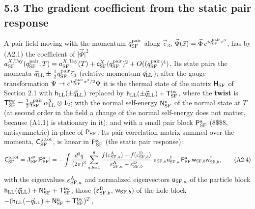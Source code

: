 \documentclass[
  10pt,
]{article}
\begin{document}
\hypertarget{the-gradient-coefficient-from-the-static-pair-response}{%
\subsection{5.3 The gradient coefficient from the static pair
response}\label{the-gradient-coefficient-from-the-static-pair-response}}

A pair field moving with the momentum \(q^{\rm pair}_{\rm SF}\) along
\(\vec e_3\),
\(\vec\Phi(\vec x)=\vec\Phi\,e^{iq^{\rm pair}_{\rm SF}x^3}\), has by
(A2.1) the coefficient of \(\lvert\vec\Phi\rvert^2\)
\(a^{X,{\rm Tay}}_{\rm SF}(q^{\rm pair}_{\rm SF};T)=a^{X,{\rm Tay}}_{\rm SF}(T)+\mathsf c^X_{\rm SF}(q^{\rm pair}_{\rm SF})^2+O((q^{\rm pair}_{\rm SF})^4)\).
Its state pairs the momenta
\(\vec q_{\rm LL}\pm\tfrac12q^{\rm pair}_{\rm SF}\vec e_3\) (relative
momentum \(\vec q_{\rm LL}\)); after the gauge transformation
\(\Psi\to e^{iq^{\rm pair}_{\rm SF}x^3/2}\Psi\) it is the thermal state
of the matrix \(\mathsf H_{\rm SF}\) of Section 2.1 with
\(\mathsf h_{\rm LL}(\pm\vec q_{\rm LL})\) replaced by
\(\mathsf h_{\rm LL}(\pm\vec q_{\rm LL})+\mathsf T^{\rm tw}_{\rm SF}\),
where the \textbf{twist} is
\(\mathsf T^{\rm tw}_{\rm SF}=\tfrac12q^{\rm pair}_{\rm SF}\,\alpha^3_{\rm LL}\otimes\mathsf 1_2\);
with the normal self-energy \(\mathsf N^{\rm n}_{\rm SF}\) of the normal
state at \(T\) (at second order in the field a change of the normal
self-energy does not matter, because (A1.1) is stationary in it); and
with a small pair block \(\mathsf P^{\rm a}_{\rm SF}\) (8\$\times\$8,
antisymmetric) in place of \(\mathsf P_{\rm SF}\). Its pair correlation
matrix summed over the momenta, \(\mathsf C^{\rm p,tot}_{\rm SF}\), is
linear in \(\mathsf P^{\rm a}_{\rm SF}\) (the static pair response):
\[\mathsf C^{\rm p,tot}_{\rm SF}=\mathcal X^{\rm P}_{\rm SF}[\mathsf P^{\rm a}_{\rm SF}]=-\int\frac{d^3q}{(2\pi)^3}\sum_{a,b=1}^8\frac{f(\varepsilon^{\rm A}_{{\rm SF},a})-f(\varepsilon^{\rm D}_{{\rm SF},b})}{\varepsilon^{\rm A}_{{\rm SF},a}-\varepsilon^{\rm D}_{{\rm SF},b}}\;\mathsf u_{{\rm SF},a}\mathsf u_{{\rm SF},a}^\dagger\,\mathsf P^{\rm a}_{\rm SF}\,\mathsf w_{{\rm SF},b}\mathsf w_{{\rm SF},b}^\dagger,\tag{A2.4}\]
with the eigenvalues \(\varepsilon^{\rm A}_{{\rm SF},a}\) and normalized
eigenvectors \(\mathsf u_{{\rm SF},a}\) of the particle block
\(\mathsf h_{\rm LL}(\vec q_{\rm LL})+\mathsf N^{\rm n}_{\rm SF}+\mathsf T^{\rm tw}_{\rm SF}\),
those (\(\varepsilon^{\rm D}_{{\rm SF},b}\), \(\mathsf w_{{\rm SF},b}\))
of the hole block
\(-(\mathsf h_{\rm LL}(-\vec q_{\rm LL})+\mathsf N^{\rm n}_{\rm SF}+\mathsf T^{\rm tw}_{\rm SF})^T\),
\end{document}
